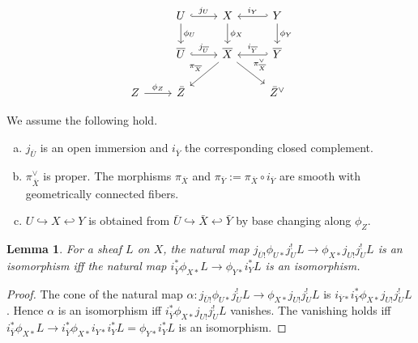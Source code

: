 \documentclass[12pt, reqno]{amsart}
\theoremstyle{plain}
\newtheorem{lem}[thm]{\bf Lemma}
\theoremstyle{definition}
\theoremstyle{definition}
\begin{document}
\begin{equation}\label{vanishing_diagram}
  \begin{tikzcd}[row sep=normal, column sep=normal]
      & U \arrow[r, hook, "j_{U}"] \arrow[d, "\phi_U"] & X \arrow[d, "\phi_X"] & Y \arrow[l, hook', "i_{Y}"'] \arrow[d,"\phi_Y"]\\
      & \overline{U} \arrow[r, hook, "j_{\overline{U}}"] & \overline{X} \arrow[dr,"\pi_{\overline{X}}^{\vee}"] \arrow[dl,"\pi_{\overline{X}}"'] & \overline{Y} \arrow[l, hook', "i_{\overline{Y}}"'] \\
      Z \arrow[r,"\phi_Z"] & \bar{Z} & & \bar{Z}^{\vee} 
  \end{tikzcd}
\end{equation}

We assume the following hold.

\begin{enumerate}[(a)]
     \item $j_{\overline{U}}$ is an open immersion and $i_{\overline{Y}}$ the corresponding closed complement.
     \item $\pi_{\overline{X}}^{\vee}$ is proper. The morphisms $\pi_{\overline{X}}$ and $\pi_{\overline{Y}}:=\pi_{\overline{X}} \circ i_{\overline{Y}}$ are smooth with geometrically connected fibers.
     \item $U \hookrightarrow X \hookleftarrow Y$ is obtained from $\bar{U} \hookrightarrow \bar{X} \hookleftarrow \bar{Y}$ by base changing along $\phi_Z$.
\end{enumerate}



\begin{lem}\label{vanishing_lemma_sta}
    For a sheaf $L$ on $X$, the natural map $j_{\overline{U}!}\phi_{U*}j_{U}^{!}L \to \phi_{X*}j_{U!}j_{U}^{!}L$ is an isomorphism iff the natural map $i_{\overline{Y}}^*\phi_{X*}L \to \phi_{Y*}i^{*}_{Y}L$ is an isomorphism.
\end{lem}

\begin{proof}
    The cone of the natural map $\alpha \colon j_{\overline{U}!}\phi_{U*}j_{U}^{!}L \to \phi_{X*}j_{U!}j_{U}^{!}L$ is $i_{\overline{Y}*}i_{\overline{Y}}^*\phi_{X*}j_{U!}j_{U}^{!}L$. Hence $\alpha$ is an isomorphism iff $i_{\overline{Y}}^*\phi_{X*}j_{U!}j_{U}^{!}L$ vanishes. The vanishing holds iff $i_{\overline{Y}}^*\phi_{X*}L \to i_{\overline{Y}}^*\phi_{X*}i_{Y*}i^{*}_{Y}L=\phi_{Y*}i^{*}_{Y}L$ is an isomorphism. 
\end{proof}
\end{document}
